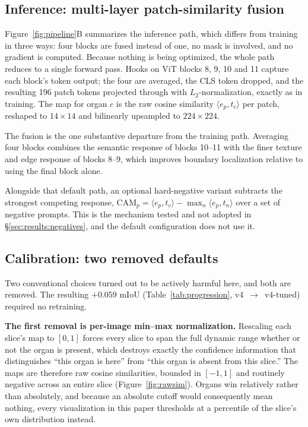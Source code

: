 \subsection{Inference: multi-layer patch-similarity fusion}
\label{sec:methods:inference}

Figure~\ref{fig:pipeline}B summarizes the inference path, which differs from
training in three ways: four blocks are fused instead of one, no mask is
involved, and no gradient is computed. Because nothing is being optimized, the
whole path reduces to a single forward pass. Hooks on ViT blocks 8, 9, 10 and 11
capture each block's token output; the four are averaged, the CLS token dropped,
and the resulting 196 patch tokens projected through  with
$L_2$-normalization, exactly as in training. The map for organ $c$ is the raw
cosine similarity $\langle e_p, t_c\rangle$ per patch, reshaped to
$14\times14$ and bilinearly upsampled to $224\times224$.

The fusion is the one substantive departure from the training path. Averaging
four blocks combines the semantic response of blocks 10--11 with the finer
texture and edge response of blocks 8--9, which improves boundary localization
relative to using the final block alone.

Alongside that default path, an optional hard-negative variant subtracts the
strongest competing response, $\text{CAM}_p = \langle e_p,
t_c\rangle - \max_{n} \langle e_p, t_n\rangle$ over a set of negative prompts.
This is the mechanism tested and not adopted in
\S\ref{sec:results:negatives}, and the default configuration does not use it.

\subsection{Calibration: two removed defaults}
\label{sec:methods:calibration}

Two conventional choices turned out to be actively harmful here, and both are
removed. The resulting $+0.059$ mIoU (Table~\ref{tab:progression},
v4~$\to$~v4-tuned) required no retraining.

\textbf{The first removal is per-image min--max normalization.} Rescaling each
slice's map to $[0,1]$ forces every slice to span the full dynamic range whether
or not the organ is present, which destroys exactly the confidence information
that distinguishes ``this organ is here'' from ``this organ is absent from this
slice.'' The maps are therefore raw cosine similarities, bounded in $[-1,1]$ and
routinely negative across an entire slice (Figure~\ref{fig:rawsim}). Organs win
relatively rather than absolutely, and because an absolute cutoff would
consequently mean nothing, every visualization in this paper thresholds at a
percentile of the slice's own distribution instead.

